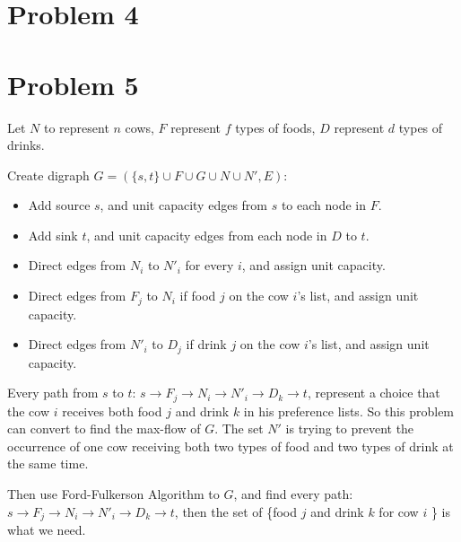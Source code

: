 \documentclass{article}
\newcommand{\ra}{\rightarrow}
\begin{document}
\pagebreak
\section*{Problem 4}


\pagebreak
\section*{Problem 5}

Let $N$ to represent $n$ cows, $F$ represent $f$ types of foods, $D$ represent $d$ types of drinks.

Create digraph $G=(\{s, t\}\cup F \cup G \cup N \cup N', E)$:
\begin{itemize}
    \item Add source $s$, and unit capacity edges from $s$ to each node in $F$.
    \item Add sink $t$, and unit capacity edges from each node in $D$ to $t$.
    \item Direct edges from $N_i$ to $N'_i$ for every $i$, and assign unit capacity.
    \item Direct edges from $F_j$ to $N_i$ if food $j$ on the cow $i$'s list, and assign unit capacity.
    \item Direct edges from $N'_i$ to $D_j$ if drink $j$ on the cow $i$'s list, and assign unit capacity.
\end{itemize}

Every path from $s$ to $t$: $s\ra F_j \ra N_i \ra N'_i\ra D_k \ra t$, 
represent a choice that the cow $i$ receives both food $j$ and drink $k$ in his preference lists.
So this problem can convert to find the max-flow of $G$. The set $N'$ is trying to prevent the occurrence of one cow receiving both two types of food and two types of drink at the same time.

Then use Ford-Fulkerson Algorithm to $G$, and find every path: $s\rightarrow F_j\rightarrow N_i\rightarrow N'_i\rightarrow D_k\rightarrow t$, then the set of \{food $j$ and drink $k$ for cow $i$ \} is what we need.
\end{document}
